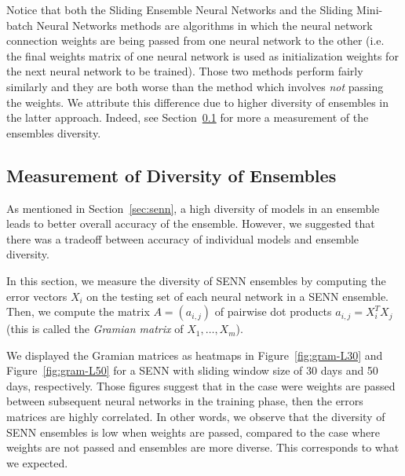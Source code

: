 \documentclass[conference]{IEEEtran}
\begin{document}
		Notice that both the Sliding Ensemble Neural Networks and the Sliding Mini-batch Neural Networks methods are algorithms in which the neural network connection weights are being passed from one neural network to the other (i.e. the final weights matrix of one neural network is used as initialization weights for the next neural network to be trained). Those two methods perform fairly similarly and they are both worse than the method which involves \emph{not} passing the weights. We attribute this difference due to higher diversity of ensembles in the latter approach. Indeed, see Section~\ref{sec:measurement-diversity} for more a measurement of the ensembles diversity.
		
		\subsection{Measurement of Diversity of Ensembles}
		\label{sec:measurement-diversity}
		
		As mentioned in Section~\ref{sec:senn}, a high diversity of models in an ensemble leads to better overall accuracy of the ensemble. However, we suggested that there was a tradeoff between accuracy of individual models and ensemble diversity.
		
		In this section, we measure the diversity of SENN ensembles by computing the error vectors $X_i$ on the testing set of each neural network in a SENN ensemble. Then, we compute the matrix $A = (a_{i,j})$ of pairwise dot products $a_{i,j} = X_i^T X_j$ (this is called the \emph{Gramian matrix} of $X_1, \ldots, X_m$).
		
		We displayed the Gramian matrices as heatmaps in Figure~\ref{fig:gram-L30} and Figure~\ref{fig:gram-L50} for a SENN with sliding window size of 30 days and 50 days, respectively. Those figures suggest that in the case were weights are passed between subsequent neural networks in the training phase, then the errors matrices are highly correlated. In other words, we observe that the diversity of SENN ensembles is low when weights are passed, compared to the case where weights are not passed and ensembles are more diverse. This corresponds to what we expected.
		
		
\end{document}
